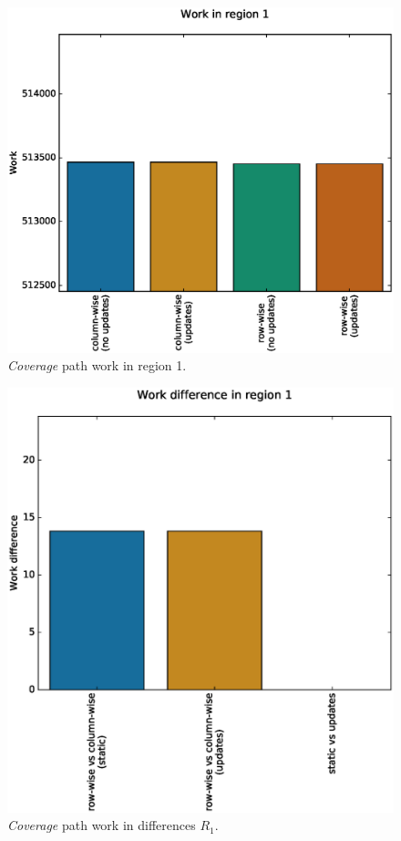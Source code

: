 \documentclass{tamuccthesis}
\begin{document}
\begin{figure}[H]
    \captionsetup{justification=centering}
    \centering
    \includegraphics[width=\textwidth,trim={0cm 0cm 0cm 0.75cm},clip]{work_r1.eps}
    \caption{\textit{Coverage} path work in region 1.}
    \label{fig:coverage_noterrain_work_r1}
\end{figure}
\begin{figure}[H]
    \captionsetup{justification=centering}
    \centering
    \includegraphics[width=\textwidth,trim={0cm 0cm 0cm 0.75cm},clip]{diff_r1.eps}
    \caption{\textit{Coverage} path work in differences $R_1$.}
    \label{fig:coverage_noterrain_diff_r1}
\end{figure}
\end{document}
